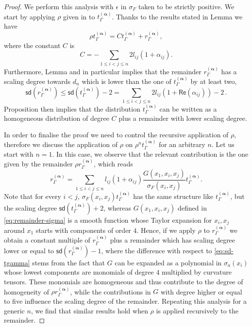 \documentclass[11pt]{book}
\newcommand{\sd}{\mathsf{sd}}
\renewcommand{\Re}{\mathsf{Re}}
\newcommand{\alphabd}{\boldsymbol{\alpha}}
\theoremstyle{break}
\begin{document}
\begin{proof}







We perform this analysis with $\epsilon$ in $\sigma_F$ taken to be strictly positive. We start by applying $\rho$ given in %
to $t_\Gamma^{(\alphabd)}$. Thanks to the results stated in Lemma %
we have
\[
\rho t_\Gamma^{(\alphabd)}  =    C   t_\Gamma^{(\alphabd)}    + r^{(\alphabd)}_\Gamma,
\]
where the constant $C$ is
\[
C= -\sum_{1\leq i<j\leq n} 2 l_{ij}(1+ \alpha_{ij}).
\]
Furthermore, Lemma %
and in particular %
implies that the remainder $r^{(\alphabd)}_\Gamma$ has a scaling degree towards $d_n$ which is lower than the one of $t_\Gamma^{(\alphabd)}$ by at least two, 
\begin{equation}\label{eq:sd-tgamma}
\sd(r^{(\alphabd)}_\Gamma) \leq \sd(t_\Gamma^{(\alphabd)})-2 = \sum_{1\leq i<j\leq n} 2 l_{ij}(1+ \Re(\alpha_{ij})) -2\,.
\end{equation}
Proposition %
then implies that the distribution $t_\Gamma^{(\alphabd)}$ can be written as a homogeneous distribution of degree $C$  
plus a remainder with lower scaling degree.

In order to finalise the proof we need to control the recursive application of $\rho$, therefore we discuss the application of $\rho$ on $\rho^nt_\Gamma^{(\alphabd)}$ for an arbitrary $n$. 
Let us start with $n=1$. In this case, we observe that the relevant contribution is the one given by the remainder $\rho r^{(\alphabd)}_\Gamma$, which reads 
\[
r^{(\alphabd)}_\Gamma = \sum_{1\leq i < j \leq n} l_{ij}(1+ \alpha_{ij}) \frac{G(x_1,x_i,x_j)}{\sigma_F(x_i,x_j)}t_\Gamma^{(\alphabd)}.
\]
Note that for every $i<j$, $\sigma_F(x_i,x_j)t_\Gamma^{(\alphabd)}$ has the same structure like $t_\Gamma^{(\alphabd)}$, but the scaling degree $\sd(t_\Gamma^{(\alphabd)}) +2$, whereas $G(x_1,x_i,x_j)$ defined in \eqref{eq:remainder-sigma} is a smooth function whose Taylor expansion for $x_i, x_j$ around $x_1$ starts with components of order $4$. Hence, if we apply $\rho$ to $r^{(\alphabd)}_\Gamma$ we obtain
a constant multiple of $r^{(\alphabd)}_\Gamma$ plus a remainder which has scaling degree lower or equal to $\sd(r^{(\alphabd)}_\Gamma)-1$, where the difference with respect to \eqref{eq:sd-tgamma} stems from the fact that $G$ can be expanded as a polynomial in $\sigma_a(x_i)$ whose lowest components are monomials of degree $4$ multiplied by curvature tensors. These monomials are homogeneous and thus contribute to the degree of homogeneity of $\rho r^{(\alphabd)}_\Gamma$, while the contributions in $G$ with degree higher or equal to five influence the scaling degree of the remainder.
Repeating this analysis for a generic $n$, we find that similar results hold when $\rho$ is applied recursively to the remainder.


\end{proof}
\end{document}
